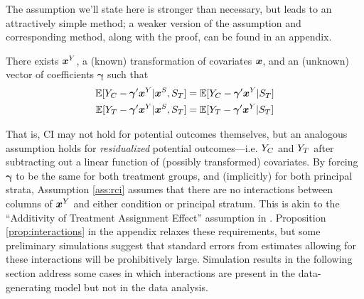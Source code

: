 \documentclass[]{article}
\begin{document}
The assumption we'll state here is stronger than necessary, but leads to an attractively simple method; a weaker version of the assumption and corresponding method, along with the proof, can be found in an appendix.

\begin{ass}\label{ass:rci}
There exists $\bm{x}^Y$, a (known) transformation of covariates $\bm{x}$, and an (unknown) vector of coefficients $\bm{\gamma}$ such that
\begin{equation}\label{eq:ass:rci}
\begin{split}
\mathbb{E}[Y_C-\bm{\gamma}'\bm{x}^Y|\bm{x}^S,S_T]&=\mathbb{E}[Y_C-\bm{\gamma}'\bm{x}^Y|S_T]\\
\mathbb{E}[Y_T-\bm{\gamma}'\bm{x}^Y|\bm{x}^S,S_T]&=\mathbb{E}[Y_T-\bm{\gamma}'\bm{x}^Y|S_T]
\end{split}
\end{equation}
\end{ass}
That is, CI may not hold for potential outcomes themselves, but an analogous assumption holds for \emph{residualized} potential outcomes---i.e. $Y_C$ and $Y_T$ after subtracting out a linear function of (possibly transformed) covariates.
By forcing $\bm{\gamma}$ to be the same for both treatment groups, and (implicitly) for both principal strata, Assumption \ref{ass:rci} assumes that there are no interactions between columns of $\bm{x}^Y$ and either condition or principal stratum.
This is akin to the ``Additivity of Treatment Assignment Effect'' assumption in \citet{jo2002}.
Proposition \ref{prop:interactions} in the appendix relaxes these requirements, but some preliminary simulations suggest that standard errors from estimates allowing for these interactions will be prohibitively large.
Simulation results in the following section address some cases in which interactions are present in the data-generating model but not in the data analysis.
\end{document}
